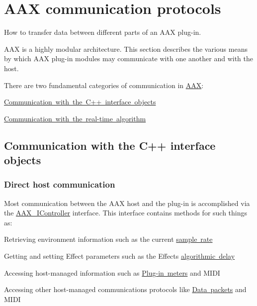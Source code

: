 \hypertarget{a00800}{}\section{A\+AX communication protocols}
\label{a00800}
How to transfer data between different parts of an A\+AX plug-\/in. 

A\+AX is a highly modular architecture. This section describes the various means by which A\+AX plug-\/in modules may communicate with one another and with the host.

There are two fundamental categories of communication in \mbox{\hyperlink{a00852}{A\+AX}}\+:
\begin{DoxyEnumerate}
\item \mbox{\hyperlink{a00800_CommonInterface_Communication_hostmodules}{Communication with the C++ interface objects}}
\item \mbox{\hyperlink{a00800_CommonInterface_Communication_algorithm}{Communication with the real-\/time algorithm}}
\end{DoxyEnumerate}\hypertarget{a00800_CommonInterface_Communication_hostmodules}{}\subsection{Communication with the C++ interface objects}\label{a00800_CommonInterface_Communication_hostmodules}
\hypertarget{a00800_CommonInterface_Communication_hostmodules_controller}{}\subsubsection{Direct host communication}\label{a00800_CommonInterface_Communication_hostmodules_controller}
Most communication between the A\+AX host and the plug-\/in is accomplished via the \mbox{\hyperlink{a01789}{A\+A\+X\+\_\+\+I\+Controller}} interface. This interface contains methods for such things as\+:
\begin{DoxyItemize}
\item Retrieving environment information such as the current \mbox{\hyperlink{a01789_afa1f9f64eeeab9570e5599f466fa699e}{sample rate}}
\item Getting and setting Effect parameters such as the Effect\textquotesingle{}s \mbox{\hyperlink{a01789_ad50aa6fd54e39623a58debd63d9551e1}{algorithmic delay}}
\item Accessing host-\/managed information such as \mbox{\hyperlink{a00807}{Plug-\/in meters}} and M\+I\+DI
\item Accessing other host-\/managed communications protocols like \mbox{\hyperlink{a00800_CommonInterface_Communication_algorithm_datapackets}{Data packets}} and M\+I\+DI
\end{DoxyItemize}

